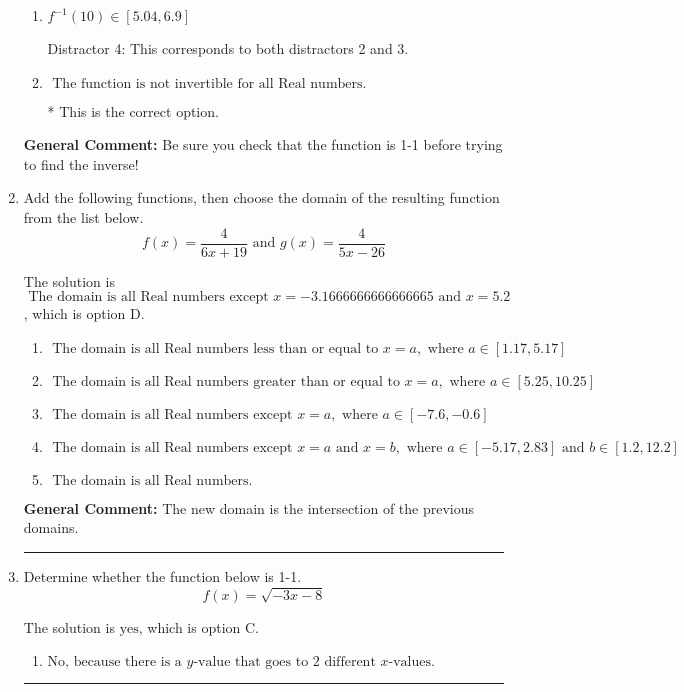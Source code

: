 \documentclass{extbook}[14pt]
\newcommand{\litem}[1]{\item #1

\rule{\textwidth}{0.4pt}}
\begin{document}
\begin{enumerate}
{\begin{enumerate}[label=\Alph*.]
 Distractor 2: This corresponds to finding the (nonexistent) inverse and not subtracting by the vertical shift.
\item \( f^{-1}(10) \in [5.04, 6.9] \)

 Distractor 4: This corresponds to both distractors 2 and 3.
\item \( \text{ The function is not invertible for all Real numbers. } \)

* This is the correct option.
\end{enumerate}

\textbf{General Comment:} Be sure you check that the function is 1-1 before trying to find the inverse!
}
\litem{
Add the following functions, then choose the domain of the resulting function from the list below.
\[ f(x) = \frac{4}{6x+19} \text{ and } g(x) = \frac{4}{5x-26} \]

The solution is \( \text{ The domain is all Real numbers except } x = -3.1666666666666665 \text{ and } x = 5.2 \), which is option D.\begin{enumerate}[label=\Alph*.]
\item \( \text{ The domain is all Real numbers less than or equal to } x = a, \text{ where } a \in [1.17, 5.17] \)


\item \( \text{ The domain is all Real numbers greater than or equal to } x = a, \text{ where } a \in [5.25, 10.25] \)


\item \( \text{ The domain is all Real numbers except } x = a, \text{ where } a \in [-7.6, -0.6] \)


\item \( \text{ The domain is all Real numbers except } x = a \text{ and } x = b, \text{ where } a \in [-5.17, 2.83] \text{ and } b \in [1.2, 12.2] \)


\item \( \text{ The domain is all Real numbers. } \)


\end{enumerate}

\textbf{General Comment:} The new domain is the intersection of the previous domains.
}
\litem{
Determine whether the function below is 1-1.
\[ f(x) = \sqrt{-3 x - 8} \]

The solution is \( \text{yes} \), which is option C.\begin{enumerate}[label=\Alph*.]
\item \( \text{No, because there is a $y$-value that goes to 2 different $x$-values.} \)


\end{enumerate}}
\end{enumerate}
\end{document}
